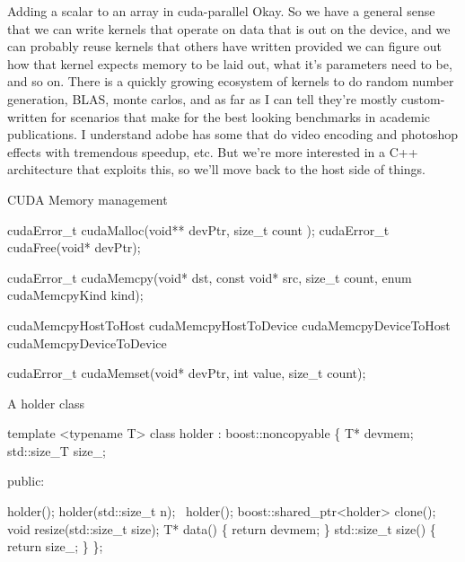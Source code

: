 \begin{frame}[fragile]{Adding a scalar to an array in cuda-parallel}
{  Okay.  So we have a general sense that we can write kernels that
  operate on data that is out on the device, and we can probably reuse
  kernels that others have written provided we can figure out how that
  kernel expects memory to be laid out, what it's parameters need to
  be, and so on.  There is a quickly growing ecosystem of kernels to
  do random number generation, BLAS, monte carlos, and as far as I can
  tell they're mostly custom-written for scenarios that make for the
  best looking benchmarks in academic publications.  I understand
  adobe has some that do video encoding and photoshop effects with
  tremendous speedup, etc.  But we're more interested in a C++
  architecture that exploits this, so we'll move back to the host side
  of things.
}
\end{frame}


\begin{frame}[fragile]{CUDA Memory management}
  \begin{semiverbatim}
cudaError_t \alert<2>{cudaMalloc}(void** devPtr, size_t count );
cudaError_t \alert<3>{cudaFree}(void* devPtr);

cudaError_t \alert<4>{cudaMemcpy}(void* dst, const void* src, 
                       size_t count, 
                       enum \alert<5>{cudaMemcpyKind} kind);

\alert<6>{cudaMemcpyHostToHost}
\alert<7>{cudaMemcpyHostToDevice}
\alert<8>{cudaMemcpyDeviceToHost}
\alert<9>{cudaMemcpyDeviceToDevice}

cudaError_t \alert<10>{cudaMemset}(void* devPtr, int value, 
                       size_t count);
  \end{semiverbatim}

\end{frame}


\begin{frame}[fragile]{A holder class}
  \begin{semiverbatim}template <typename T>
class holder : boost::noncopyable
\{
    T* devmem;
    std::size_T size_;

  public:

    holder();
    holder(std::size_t n);
    ~holder();
    boost::shared_ptr<holder> clone();
    void resize(std::size_t size);
    T* data() \{ return devmem; \}
    std::size_t size() \{ return size_; \}
\};
\end{semiverbatim}
\end{frame}

